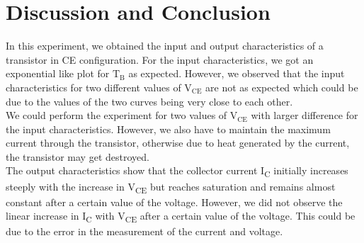\documentclass{scrartcl}
\begin{document}
\section{Discussion and Conclusion}
In this experiment, we obtained the input and output characteristics of a transistor in CE configuration. For the input characteristics, we got an exponential like plot for $\mathrm{T_{B}}$ as expected. However, we observed that the input characteristics for two different values of $\mathrm{V_{CE}}$ are not as expected which could be due to the values of the two curves being very close to each other. \\[0.2cm]
We could perform the experiment for two values of $\mathrm{V_{CE}}$ with larger difference for the input characteristics. However, we also have to maintain the maximum current through the transistor, otherwise due to heat generated by the current, the transistor may get destroyed. \\[0.2cm]
 The output characteristics show that the collector current I\textsubscript{C} initially increases steeply with the increase in V\textsubscript{CE} but reaches saturation and remains almost constant after a certain value of the voltage. However, we did not observe the linear increase in I\textsubscript{C} with V\textsubscript{CE} after a certain value of the voltage. This could be due to the error in the measurement of the current and voltage. 
 
\end{document}
